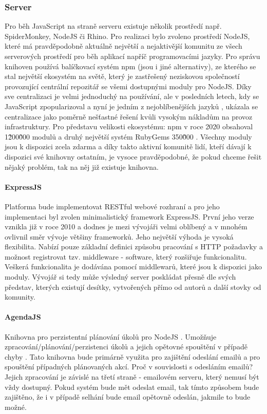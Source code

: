\subsubsection{Server}
Pro běh JavaScript na straně serveru existuje několik prostředí např. SpiderMonkey, NodeJS či Rhino. Pro realizaci bylo zvoleno prostředí NodeJS, které má pravděpodobně aktuálně největší a nejaktivější komunitu ze všech serverových prostředí pro běh aplikací napříč programovacími jazyky. Pro správu knihoven používá balíčkovací systém npm (jsou i jiné alternativy), ze kterého se stal největší ekosystém na světě, který je zastřešený neziskovou společností  provozující centrální repozitář se všemi dostupnými moduly pro NodeJS. Díky sve centralizaci je velmi jednoduchý na používání, ale v posledních letech, kdy se JavaScript zpopularizoval a nyní je jedním z nejoblíbenějších jazyků \cite{survey-languages}, ukázala se centralizace jako poměrně nešťastné řešení kvůli vysokým nákladům na provoz infrastruktury. Pro představu velikosti ekosystému: npm v roce 2020 obsahoval 1\~200\~000 modulů a druhý největší systém RubyGems  350\~000 \cite{modulecounts}. Všechny moduly jsou k dispozici zcela zdarma a díky takto aktivní komunitě lidí, kteří dávají k dispozici své knihovny ostatním, je vysoce pravděpodobné, že pokud chceme řešit nějaký problém, tak na něj již existuje knihovna.

\paragraph{ExpressJS}\label{expressjs} Platforma bude implementovat RESTful webové rozhraní a pro jeho implementaci byl zvolen minimalistický framework ExpressJS. První jeho verze vznikla již v roce 2010 a dodnes je mezi vývojáři velmi oblíbený a v mnohém ovlivnil směr vývoje většiny frameworků. Jeho největší výhoda je vysoká flexibilita. Nabízí pouze základní definici způsobu pracování s HTTP požadavky a možnost registrovat tzv. middleware - software, který rozšiřuje funkcionalitu. Veškerá funkcionalita je dodávána pomocí middlewarů, které jsou k dispozici jako moduly. Vývojář si tedy může výsledný server poskládat přesně dle svých představ, kterých existují desítky, vytvořených přímo od autorů a další stovky od komunity. \cite{expressjs}


\paragraph{AgendaJS} Knihovna pro perzistentní plánování úkolů pro NodeJS \cite{agendajs}. Umožňuje zpracování/plánování/perzistenci úkolů a jejich opětovné spouštění v případě chyby \cite{agendajs}. Tato knihovna bude primárně využita pro zajištění odeslání emailů a pro spouštění případných plánovaných akcí. Proč v souvislosti s odesláním emailů? Jejich zpracování je závislé na třetí straně - emailovém serveru, který nemusí být vždy dostupný. Pokud systém bude mět odeslat email, tak tímto způsobem bude zajištěno, že i v případě selhání bude email opětovně odeslán, jakmile to bude možné.

